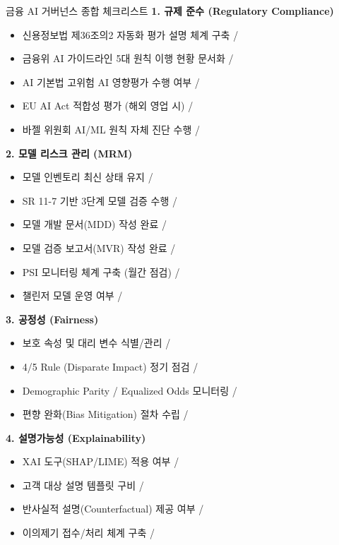 \begin{practicaltool}{금융 AI 거버넌스 종합 체크리스트}
\textbf{1. 규제 준수 (Regulatory Compliance)}
\begin{itemize}
    \item 신용정보법 제36조의2 자동화 평가 설명 체계 구축 \checkmark / \texttimes
    \item 금융위 AI 가이드라인 5대 원칙 이행 현황 문서화 \checkmark / \texttimes
    \item AI 기본법 고위험 AI 영향평가 수행 여부 \checkmark / \texttimes
    \item EU AI Act 적합성 평가 (해외 영업 시) \checkmark / \texttimes
    \item 바젤 위원회 AI/ML 원칙 자체 진단 수행 \checkmark / \texttimes
\end{itemize}

\textbf{2. 모델 리스크 관리 (MRM)}
\begin{itemize}
    \item 모델 인벤토리 최신 상태 유지 \checkmark / \texttimes
    \item SR 11-7 기반 3단계 모델 검증 수행 \checkmark / \texttimes
    \item 모델 개발 문서(MDD) 작성 완료 \checkmark / \texttimes
    \item 모델 검증 보고서(MVR) 작성 완료 \checkmark / \texttimes
    \item PSI 모니터링 체계 구축 (월간 점검) \checkmark / \texttimes
    \item 챌린저 모델 운영 여부 \checkmark / \texttimes
\end{itemize}

\textbf{3. 공정성 (Fairness)}
\begin{itemize}
    \item 보호 속성 및 대리 변수 식별/관리 \checkmark / \texttimes
    \item 4/5 Rule (Disparate Impact) 정기 점검 \checkmark / \texttimes
    \item Demographic Parity / Equalized Odds 모니터링 \checkmark / \texttimes
    \item 편향 완화(Bias Mitigation) 절차 수립 \checkmark / \texttimes
\end{itemize}

\textbf{4. 설명가능성 (Explainability)}
\begin{itemize}
    \item XAI 도구(SHAP/LIME) 적용 여부 \checkmark / \texttimes
    \item 고객 대상 설명 템플릿 구비 \checkmark / \texttimes
    \item 반사실적 설명(Counterfactual) 제공 여부 \checkmark / \texttimes
    \item 이의제기 접수/처리 체계 구축 \checkmark / \texttimes
\end{itemize}


\end{practicaltool}
